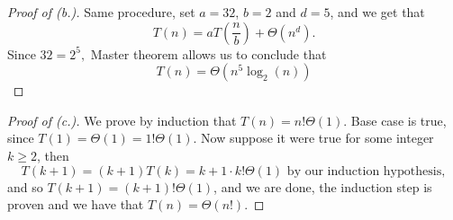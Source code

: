 \documentclass{article}
\begin{document}
\begin{proof}[Proof of (b.)]
 Same procedure, set $a = 32$, $b= 2$ and $d= 5$, and we get that \[
 T(n) = aT\left( \frac{n}{b} \right) + \Theta(n^{d}).
 \]   Since $32 = 2^{5},$ Master theorem allows us to conclude that \[
 T(n) = \Theta(n^{5}\log_{2}(n))
 \] 
\end{proof}

\begin{proof}[Proof of (c.)]
   We prove by induction that $T(n) = n!\Theta(1)$. Base case is true, since $T(1) = 
   \Theta(1) = 1!\Theta(1)$.
   Now suppose it were true for some integer $k \geq 2$, then  \[
   T(k+1) =(k+1)T(k) = k+1\cdot k!\Theta(1) \text{ by our induction hypothesis},
   \] and so $T(k+1) = (k+1)! \Theta(1)$, and we are done, the induction step is proven and we 
   have that $T(n) = \Theta(n!)$.
\end{proof}
\newpage
\end{document}
